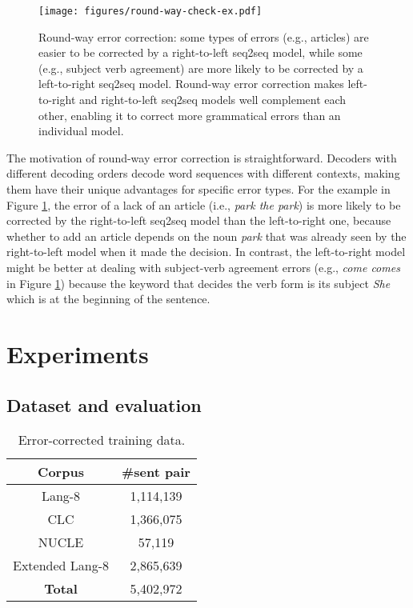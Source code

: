 \documentclass{article} \usepackage{MSRA_TR,times}
\begin{document}
\begin{figure}
\centering
\texttt{[image: figures/round-way-check-ex.pdf]}
\caption{Round-way error correction: some types of errors (e.g., articles) are easier to be corrected by a right-to-left seq2seq model, while some (e.g., subject verb agreement) are more likely to be corrected by a left-to-right seq2seq model. Round-way error correction makes left-to-right and right-to-left seq2seq models well complement each other, enabling it to correct more grammatical errors than an individual model.}\label{fig:round}
\end{figure}

The motivation of round-way error correction is straightforward. Decoders with different decoding orders decode word sequences with different contexts, making them have their unique advantages for specific error types. For the example in Figure \ref{fig:round}, the error of a lack of an article (i.e., \textit{park  the park}) is more likely to be corrected by the right-to-left seq2seq model than the left-to-right one, because whether to add an article depends on the noun \textit{park} that was already seen by the right-to-left model when it made the decision. In contrast, the left-to-right
model might be better at dealing with subject-verb agreement errors (e.g., \textit{come  comes} in Figure \ref{fig:round}) because the keyword that decides the verb form is its subject \textit{She} which is at the beginning of the sentence.

\section{Experiments}
\subsection{Dataset and evaluation}\label{subsec:data}

\begin{table}[h]
\centering
\begin{tabular}{c|c}
\hline
\textbf{Corpus} & \textbf{\#sent pair} \\ 
\hline
Lang-8          &            1,114,139         \\
CLC             &           1,366,075           \\
NUCLE           &    57,119        \\
Extended Lang-8 &    2,865,639 \\
\hline
\bf Total	&  5,402,972 \\
\hline
\end{tabular}
\caption{Error-corrected training data.}
\label{tab:data_stats}
\end{table}
\end{document}
